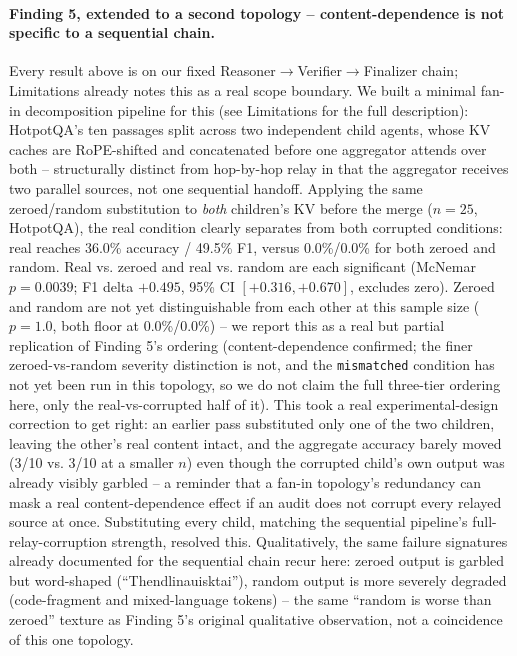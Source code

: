 \documentclass[11pt]{article}
\begin{document}
\paragraph{Finding 5, extended to a second topology -- content-dependence
is not specific to a sequential chain.} Every result above is on our
fixed Reasoner$\to$Verifier$\to$Finalizer chain; Limitations already
notes this as a real scope boundary. We built a minimal fan-in
decomposition pipeline for this (see Limitations for the full
description): HotpotQA's ten passages split across two independent child
agents, whose KV caches are RoPE-shifted and concatenated before one
aggregator attends over both -- structurally distinct from hop-by-hop
relay in that the aggregator receives two parallel sources, not one
sequential handoff. Applying the same zeroed/random substitution to
\emph{both} children's KV before the merge ($n=25$, HotpotQA), the real
condition clearly separates from both corrupted conditions: real reaches
36.0\% accuracy / 49.5\% F1, versus 0.0\%/0.0\% for both zeroed and
random. Real vs. zeroed and real vs. random are each significant
(McNemar $p=0.0039$; F1 delta $+0.495$, 95\% CI $[+0.316, +0.670]$,
excludes zero). Zeroed and random are not yet distinguishable from each
other at this sample size ($p=1.0$, both floor at 0.0\%/0.0\%) -- we
report this as a real but partial replication of Finding 5's ordering
(content-dependence confirmed; the finer zeroed-vs-random severity
distinction is not, and the \texttt{mismatched} condition has not yet
been run in this topology, so we do not claim the full three-tier
ordering here, only the real-vs-corrupted half of it). This took a real
experimental-design correction to get right: an earlier pass substituted
only one of the two children, leaving the other's real content intact,
and the aggregate accuracy barely moved (3/10 vs. 3/10 at a smaller $n$)
even though the corrupted child's own output was already visibly garbled
-- a reminder that a fan-in topology's redundancy can mask a real
content-dependence effect if an audit does not corrupt every relayed
source at once. Substituting every child, matching the sequential
pipeline's full-relay-corruption strength, resolved this. Qualitatively,
the same failure signatures already documented for the sequential chain
recur here: zeroed output is garbled but word-shaped (``Thendlinauisktai''),
random output is more severely degraded (code-fragment and mixed-language
tokens) -- the same ``random is worse than zeroed'' texture as Finding
5's original qualitative observation, not a coincidence of this one
topology.
\end{document}
